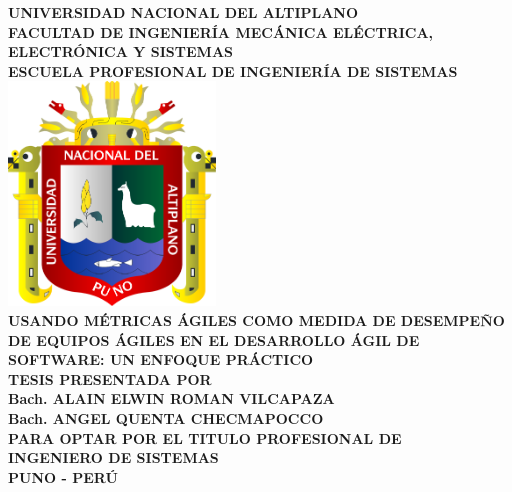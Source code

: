 \textbf{\fontsize{18pt}{16.8pt}\selectfont UNIVERSIDAD NACIONAL DEL ALTIPLANO}\\
\vspace{0.5cm}
\textbf{\fontsize{16pt}{16.8pt}\selectfont FACULTAD DE INGENIERÍA MECÁNICA ELÉCTRICA, ELECTRÓNICA Y SISTEMAS}\\
\vspace{0.5cm}
\textbf{\fontsize{14pt}{16.8pt}\selectfont ESCUELA PROFESIONAL DE INGENIERÍA DE SISTEMAS}\\
\vspace{0.5cm}
\includegraphics[width=5.5cm]{chapters/utils/logo-unap.png}\\
\vspace{0.8cm}
\textbf{\fontsize{14pt}{16.8pt}\selectfont USANDO MÉTRICAS ÁGILES COMO MEDIDA DE DESEMPEÑO DE EQUIPOS ÁGILES EN EL DESARROLLO ÁGIL DE SOFTWARE: UN ENFOQUE PRÁCTICO}\\
\vspace{0.5cm}
\textbf{\fontsize{14pt}{16.8pt}\selectfont TESIS PRESENTADA POR}\\
\vspace{0.5cm}
\textbf{\fontsize{16pt}{16.8pt}\selectfont Bach. ALAIN ELWIN ROMAN VILCAPAZA}\\
\textbf{\fontsize{16pt}{16.8pt}\selectfont Bach. ANGEL QUENTA CHECMAPOCCO}\\
\vspace{0.5cm}
\textbf{\fontsize{14pt}{16.8pt}\selectfont PARA OPTAR POR EL TITULO PROFESIONAL DE}\\
\vspace{0.5cm}
\textbf{\fontsize{16pt}{16.8pt}\selectfont INGENIERO DE SISTEMAS}\\
\vspace{0.5cm}
\textbf{\fontsize{14pt}{16.8pt}\selectfont PUNO - PERÚ}\\
\vspace{0.5cm}
\textbf{\fontsize{14pt}{16.8pt}}\\
